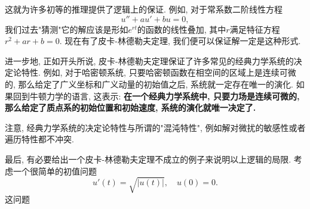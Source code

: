 这就为许多初等的推理提供了逻辑上的保证. 例如, 对于常系数二阶线性方程
$$
u''+au'+bu=0,
$$
我们过去"猜测"它的解应该是形如$e^{rt}$的函数的线性叠加, 其中$r$满足特征方程$r^2+ar+b=0$. 现在有了皮卡-林德勒夫定理, 我们便可以保证解一定是这种形式. 

进一步地, 正如开头所说, 皮卡-林德勒夫定理保证了许多常见的经典力学系统的决定论特性. 例如, 对于哈密顿系统, 只要哈密顿函数在相空间的区域上是连续可微的, 那么给定了广义坐标和广义动量的初始值之后, 系统就一定存在唯一的演化. 如果回到牛顿力学的语言, 这表示: \textbf{在一个经典力学系统中, 只要力场是连续可微的, 那么给定了质点系的初始位置和初始速度, 系统的演化就唯一决定了.}

注意, 经典力学系统的决定论特性与所谓的"混沌特性", 例如解对微扰的敏感性或者遍历特性都不冲突.

最后, 有必要给出一个皮卡-林德勒夫定理不成立的例子来说明以上逻辑的局限. 考虑一个很简单的初值问题
$$
u'(t)=\sqrt{|u(t)|},\quad u(0)=0.
$$
这问题